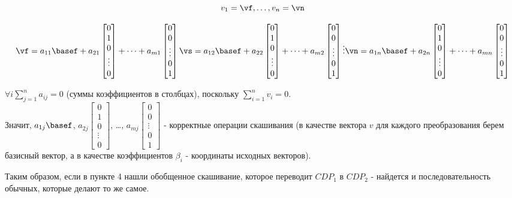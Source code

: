 \documentclass[16pt]{article}
\theoremstyle{definition}
\begin{document}
\def\bases{
\begin{bmatrix}
    0 \\
    1 \\
    0 \\
    \vdots \\
    0
\end{bmatrix}}

\def\basem{
\begin{bmatrix}
    0 \\
    0 \\
    \vdots \\
    0 \\
    1
\end{bmatrix}}

\begin{equation}
v_1 = \vf, \dots, v_n = \vn
\end{equation}

\begin{align*} 

\vf = a_{11}\basef + a_{21}\bases + \dots + a_{m1}\basem


\vs = a_{12}\basef + a_{22}\bases + \dots + a_{m2}\basem

\vdots

\vn = a_{1n}\basef + a_{2n}\bases + \dots + a_{mn}\basem
\end{align*}

$\forall i \sum_{j=1}^na_{ij} = 0$ (суммы коэффициентов в столбцах), поскольку $\sum_{i=1}^{n} v_i = 0$. 
\\
Значит, $a_{1j}\basef$, $a_{2j}\bases$, \dots, $a_{mj}\basem$ -  корректные операции скашивания (в качестве вектора $v$ для каждого преобразования берем базисный вектор, а в качестве коэффициентов $\beta_i$ - координаты исходных векторов).

Таким образом, если в пункте 4 нашли обобщенное скашивание, которое переводит $CDP_1$ в $CDP_2$ - найдется и последовательность обычных, которые делают то же самое.
\end{document}
